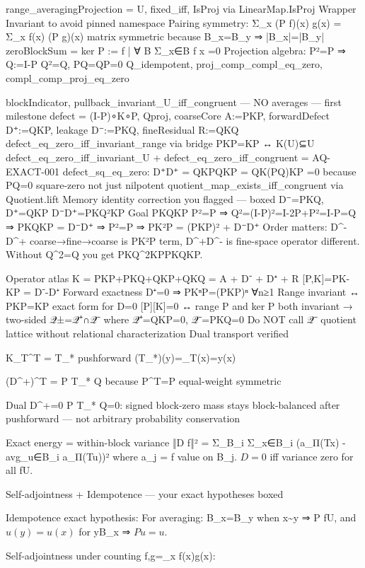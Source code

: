 range_averagingProjection = U, fixed_iff, IsProj via LinearMap.IsProj
   Wrapper Invariant to avoid pinned namespace
   Pairing symmetry: Σ_x (P f)(x) g(x) = Σ_x f(x) (P g)(x) matrix symmetric because B_x=B_y ⇒ |B_x|=|B_y|
   zeroBlockSum = ker P := {f | ∀ B Σ_{x∈B} f x =0}
   Projection algebra: P²=P ⇒ Q:=I-P Q²=Q, PQ=QP=0
   Q_idempotent, proj_comp_compl_eq_zero, compl_comp_proj_eq_zero

blockIndicator, pullback_invariant_U_iff_congruent — NO averages — first milestone
   defect = (I-P)∘K∘P, Qproj, coarseCore A:=PKP, forwardDefect D⁺:=QKP, leakage D⁻:=PKQ, fineResidual R:=QKQ
   defect_eq_zero_iff_invariant_range via bridge PKP=KP ↔ K(U)⊆U
   defect_eq_zero_iff_invariant_U + defect_eq_zero_iff_congruent = AQ-EXACT-001
   defect_sq_eq_zero: D⁺D⁺ = QKPQKP = QK(PQ)KP =0 because PQ=0 square-zero not just nilpotent
   quotient_map_exists_iff_congruent via Quotient.lift
Memory identity correction you flagged — boxed
D⁻=PKQ, D⁺=QKP
D⁻D⁺=PKQ²KP
Goal PKQKP
P²=P ⇒ Q²=(I-P)²=I-2P+P²=I-P=Q
⇒ PKQKP = D⁻D⁺
⇒ P²=P ⇒ PK²P = (PKP)² + D⁻D⁺
Order matters: D^-D^+ coarse→fine→coarse is PK²P term, D^+D^- is fine-space operator different. Without Q^2=Q you get PKQ^2KP\neq PKQKP.

Operator atlas
K = PKP+PKQ+QKP+QKQ = A + D⁻ + D⁺ + R
[P,K]=PK-KP = D⁻-D⁺
Forward exactness D⁺=0 ⇒ PKⁿP=(PKP)ⁿ ∀n≥1
Range invariant ↔ PKP=KP exact form for D=0
[P][K]=0 ↔ range P and ker P both invariant → two-sided 𝒬±=𝒬⁺∩𝒬⁻ where 𝒬⁺={QKP=0}, 𝒬⁻={PKQ=0}
Do NOT call 𝒬⁻ quotient lattice without relational characterization
Dual transport verified

K_T^T = T_* pushforward (T_*\mu)(y)=\sum_{T(x)=y}\mu(x)

(D^+)^T = P T_* Q because P^T=P equal-weight symmetric

Dual D^+=0 \Leftrightarrow  P T_* Q=0: signed block-zero mass stays block-balanced after pushforward — not arbitrary probability conservation

Exact energy = within-block variance
‖D f‖² = Σ_{B_i} Σ_{x∈B_i} (a_{Π(Tx)} - avg_{u∈B_i} a_{Π(Tu)})²
where a_j = f value on B_j. $D=0$ iff variance zero for all f\in U.

Self-adjointness + Idempotence — your exact hypotheses boxed

Idempotence exact hypothesis:
For averaging: B_x=B_y when x\sim y ⇒ P f\in U, and $u(y)=u(x)$ for y\in B_x ⇒ $P u=u$.

Self-adjointness under counting \langle f,g\rangle=\sum_x f(x)g(x):

